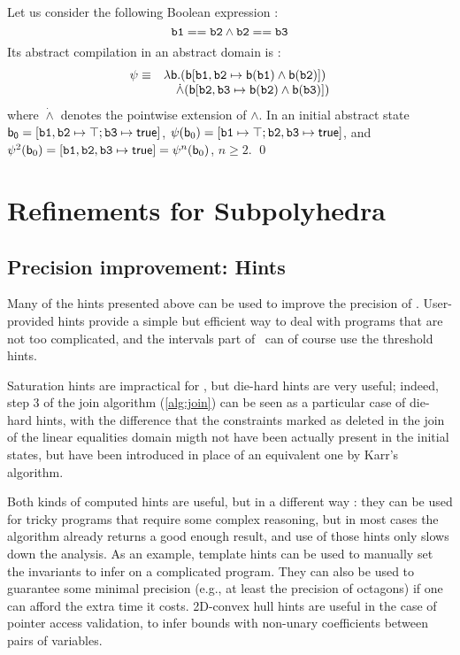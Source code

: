 \documentclass[sttt]{svjour}
\begin{document}
\begin{example}
Let us consider the following Boolean expression :
\[
 \mathtt{b1} == \mathtt{b2} \wedge \mathtt{b2} == \mathtt{b3}
\]
Its abstract compilation in an abstract domain  is :
\[
 \begin{array}{rl}
 \psi \equiv & \lambda \mathsf{b}. (\mathsf{b}[\mathtt{b1},\mathtt{b2} \mapsto \mathsf{b}(\mathtt{b1}) \wedge \mathsf{b}(\mathtt{b2})]) \\
 & \quad \dot\wedge (\mathsf{b}[\mathtt{b2},\mathtt{b3} \mapsto \mathsf{b}(\mathtt{b2}) \wedge \mathsf{b}(\mathtt{b3})]) \\
 \end{array}
\]
where $\dot\wedge$ denotes the pointwise extension of $\wedge$. 
In an initial abstract state  $\mathsf{b_0} = [\mathtt{b1}, \mathtt{b2} \mapsto \top; \mathtt{b3} \mapsto \mathsf{true}]$,  
$\psi(\mathsf{b}_0) = [ \mathtt{b1} \mapsto \top; \mathtt{b2}, \mathtt{b3} \mapsto \mathsf{true}  ]$, and $\psi^2(\mathsf{b}_0) = [ \mathtt{b1}, \mathtt{b2}, \mathtt{b3} \mapsto \mathsf{true}] = \psi^n(\mathsf{b}_0)$, $n \geq 2$. \qed 
\end{example}


\section{Refinements for Subpolyhedra}

\subsection{Precision improvement: Hints}

Many of the hints presented above can be used to improve the precision of \Subpoly.
User-provided hints provide a simple but efficient way to deal with programs that are not too complicated,
and the intervals part of \Subpoly\ can of course use the threshold hints.

Saturation hints are impractical for \Subpoly, but die-hard hints are very useful; indeed, step 3 of the join algorithm (\ref{alg:join}) can be seen as a particular case of die-hard hints, with the difference that the constraints marked as deleted in the join of the linear equalities domain migth not have been actually present in the initial states, but have been introduced in place of an equivalent one by Karr's algorithm.

Both kinds of computed hints are useful, but in a different way : they can be used for tricky programs that require some complex reasoning, but in most cases the algorithm already returns a good enough result, and use of those hints only slows down the analysis.
As an example, template hints can be used to manually set the invariants to infer on a complicated program.
They can also be used to guarantee some minimal precision (e.g., at least the precision of octagons) if one can afford the extra time it costs.
2D-convex hull hints are useful in the case of pointer access validation, to infer bounds with non-unary coefficients between pairs of variables.
\end{document}
